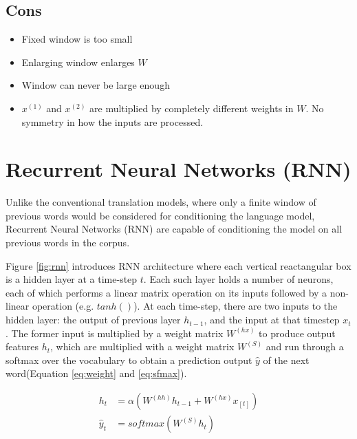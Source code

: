 \documentclass[letterpaper]{article}
\begin{document}
\subsection{Cons}
\begin{itemize}
	\item Fixed window is too small
	\item Enlarging window enlarges $W$
	\item Window can never be large enough
	\item $x^{(1)}$ and $x^{(2)}$ are multiplied by completely different
	weights in $W$. No symmetry in how the inputs are processed.
\end{itemize}

\section{Recurrent Neural Networks (RNN)}
Unlike the conventional translation models, where only a finite
window of previous words would be considered for conditioning
the language model, Recurrent Neural Networks (RNN) are capable
of conditioning the model on all previous words in the corpus.

Figure \ref{fig:rnn} introduces RNN architecture where each
vertical reactangular box is a hidden layer at a time-step $t$.
Each such layer holds a number of neurons, each of which performs
a linear matrix operation on its inputs followed by a non-linear
operation (e.g. $tanh()$). At each time-step, there are two inputs
to the hidden layer: the output of previous layer $h_{t-1}$, and
the input at that timestep $x_t$. The former input is multiplied
by a weight matrix $W^{(hx)}$ to produce output features $h_t$,
which are multiplied with a weight matrix $W^{(S)}$ and run through
a softmax over the vocabulary to obtain a prediction output $\hat{y}$
of the next word(Equation \ref{eq:weight} and \ref{eq:sfmax}).

\begin{align}
	h_t &= \alpha(W^{(hh)}h_{t-1} + W^{(hx)}x_{[t]}) \label{eq:weight} \\
	\hat{y}_{t} &= softmax(W^{(S)}h_t) \label{eq:sfmax}
\end{align}
\end{document}
